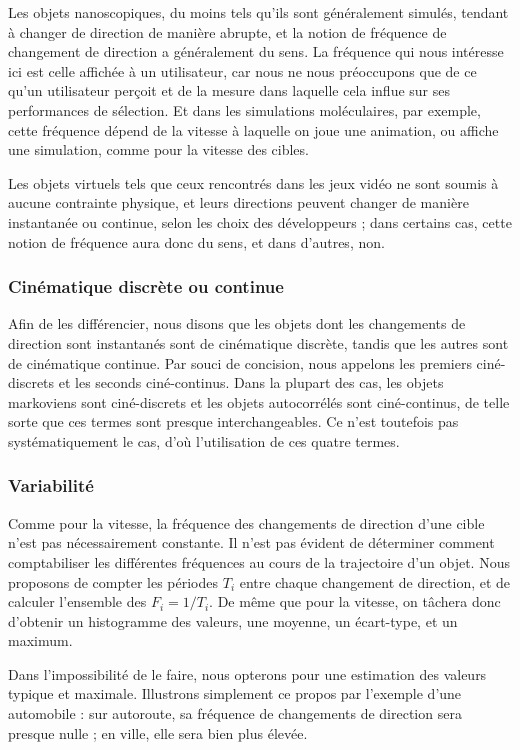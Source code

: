 	Les objets nanoscopiques, du moins tels qu'ils sont généralement simulés, tendant à changer de direction de manière abrupte, et la notion de fréquence de changement de direction a généralement du sens. La fréquence qui nous intéresse ici est celle affichée à un utilisateur, car nous ne nous préoccupons que de ce qu'un utilisateur perçoit et de la mesure dans laquelle cela influe sur ses performances de sélection. Et dans les simulations moléculaires, par exemple, cette fréquence dépend de la vitesse à laquelle on joue une animation, ou affiche une simulation, comme pour la vitesse des cibles.
	
	Les objets virtuels tels que ceux rencontrés dans les jeux vidéo ne sont soumis à aucune contrainte physique, et leurs directions peuvent changer de manière instantanée ou continue, selon les choix des développeurs ; dans certains cas, cette notion de fréquence aura donc du sens, et dans d'autres, non.
	
	\subsubsection{Cinématique discrète ou continue}
	\label{sub:kinematicTypes}
	Afin de les différencier, nous disons que les objets dont les changements de direction sont instantanés sont de cinématique discrète, tandis que les autres sont de cinématique continue. Par souci de concision, nous appelons les premiers ciné-discrets et les seconds ciné-continus. Dans la plupart des cas, les objets markoviens sont ciné-discrets et les objets autocorrélés sont ciné-continus, de telle sorte que ces termes sont presque interchangeables. Ce n'est toutefois pas systématiquement le cas, d'où l'utilisation de ces quatre termes.
	
	\subsubsection{Variabilité}
	Comme pour la vitesse, la fréquence des changements de direction d'une cible n'est pas nécessairement constante. Il n'est pas évident de déterminer comment comptabiliser les différentes fréquences au cours de la trajectoire d'un objet. Nous proposons de compter les périodes $T_{i}$ entre chaque changement de direction, et de calculer l'ensemble des $F_{i} = 1/T_{i}$. De même que pour la vitesse, on tâchera donc d'obtenir un histogramme des valeurs, une moyenne, un écart-type, et un maximum.
	
	Dans l'impossibilité de le faire, nous opterons pour une estimation des valeurs \og typique \fg{} et maximale. Illustrons simplement ce propos par l'exemple d'une automobile : sur autoroute, sa fréquence de changements de direction sera presque nulle ; en ville, elle sera bien plus élevée.
	
